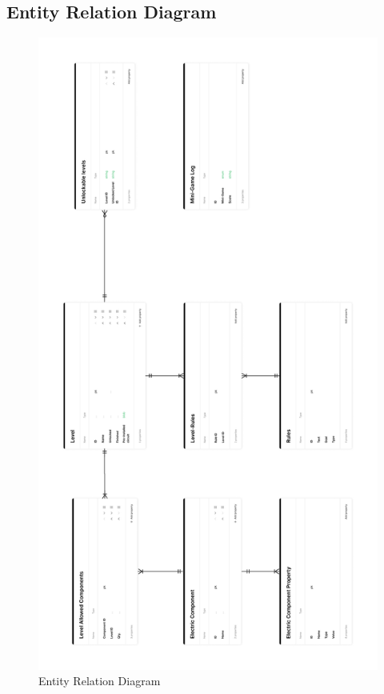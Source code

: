 \documentclass[../main.tex]{subfiles}
\begin{document}
\subsection{Entity Relation Diagram }
\begin{figure}[h!]
\centering
\includegraphics[scale=0.08]{images/chapter3/ERD.png}
\caption{Entity Relation Diagram }
\label{Entity Relation Diagram }
\end{figure}
\vfill
\newpage
\end{document}
